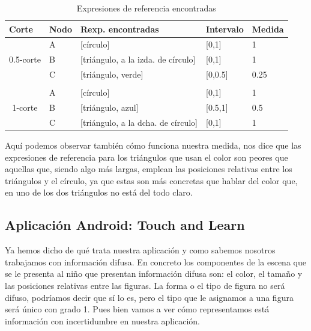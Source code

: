 \documentclass[10pt,a4paper]{article}
\begin{document}
\begin{table}[H]
\centering
\caption{Expresiones de referencia encontradas}
\label{my-label}
\begin{tabular}{|l|l|l|l|l|}
\hline
Corte                                          & Nodo & Rexp. encontradas                      & Intervalo   & Medida \\ \hline
\multirow{3}{*}{0.5-corte}                     & A    & {[}círculo{]}                          & {[}0,1{]}   & 1      \\ \cline{2-5} 
                                               & B    & {[}triángulo, a la izda. de círculo{]} & {[}0,1{]}   & 1      \\ \cline{2-5} 
                                               & C    & {[}triángulo, verde{]}                 & {[}0,0.5{]} & 0.25   \\ \hline
\multicolumn{5}{|l|}{}                                                                                                \\ \hline
\multicolumn{1}{|c|}{\multirow{3}{*}{1-corte}} & A    & {[}círculo{]}                          & {[}0,1{]}   & 1      \\ \cline{2-5} 
\multicolumn{1}{|c|}{}                         & B    & {[}triángulo, azul{]}                  & {[}0.5,1{]} & 0.5    \\ \cline{2-5} 
\multicolumn{1}{|c|}{}                         & C    & {[}triángulo, a la dcha. de círculo{]} & {[}0,1{]}   & 1      \\ \hline
\end{tabular}
\end{table}

Aquí podemos observar también cómo funciona nuestra medida, nos dice que las expresiones de referencia para los triángulos que usan el color son peores que aquellas que, siendo algo más largas, emplean las posiciones relativas entre los triángulos y el círculo, ya que estas son más concretas que hablar del color que, en uno de los dos triángulos no está del todo claro.\\

\subsection{Aplicación Android: Touch and Learn}

Ya hemos dicho de qué trata nuestra aplicación y como sabemos nosotros trabajamos con información difusa. En concreto los componentes de la escena que se le presenta al niño que presentan información difusa son: el color, el tamaño y las posiciones relativas entre las figuras. La forma o el tipo de figura no será difuso, podríamos decir que sí lo es, pero el tipo que le asignamos a una figura será único con grado 1. Pues bien vamos a ver cómo representamos está información con incertidumbre en nuestra aplicación.
\end{document}
